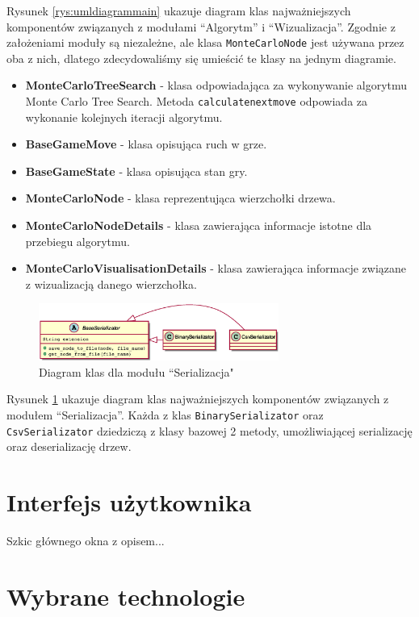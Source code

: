 \documentclass{article}
\let\oldsection\section
\renewcommand\section{\clearpage\oldsection}
\newcommand{\code}[1]{\colorbox{light-gray}{\texttt{#1}}}
\begin{document}
	\noindent Rysunek \ref{rys:umldiagrammain} ukazuje diagram klas najważniejszych komponentów związanych z modułami ``Algorytm'' i ``Wizualizacja''. Zgodnie z założeniami moduły są niezależne, ale klasa \code{MonteCarloNode} jest używana przez oba z nich, dlatego zdecydowaliśmy się umieścić te klasy na jednym diagramie. \\
	\begin{itemize}
		\item \textbf{MonteCarloTreeSearch} - klasa odpowiadająca za wykonywanie algorytmu Monte Carlo Tree Search. Metoda \code{calculate\textunderscore next\textunderscore move} odpowiada za wykonanie kolejnych iteracji algorytmu.
		\item \textbf{BaseGameMove} - klasa opisująca ruch w grze.
		\item \textbf{BaseGameState} - klasa opisująca stan gry.
		\item \textbf{MonteCarloNode} - klasa reprezentująca wierzchołki drzewa.
		\item \textbf{MonteCarloNodeDetails} - klasa zawierająca informacje istotne dla przebiegu algorytmu. 
		\item \textbf{MonteCarloVisualisationDetails} - klasa zawierająca informacje związane z wizualizacją danego wierzchołka.
	\end{itemize}
	
	
	\begin{figure}[h!]
		\centering
		\includegraphics[width=0.7\textwidth]{umldiagram_serialization}
		\caption{Diagram klas dla modułu ``Serializacja"}
		\label{rys:umldiagramserialization}
	\end{figure}

	\noindent Rysunek \ref{rys:umldiagramserialization} ukazuje diagram klas najważniejszych komponentów związanych z modułem ``Serializacja''. Każda z klas \code{BinarySerializator} oraz \code{CsvSerializator} dziedziczą z klasy bazowej 2 metody, umożliwiającej serializację oraz deserializację drzew.
	
	\section{Interfejs użytkownika}
	Szkic głównego okna z opisem...
	
	\section{Wybrane technologie}
\end{document}
